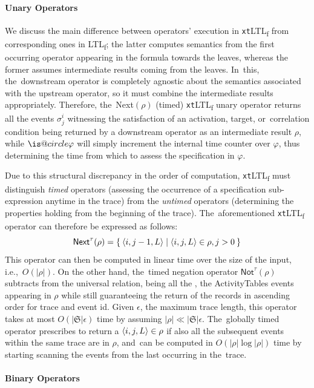 \documentclass[information,article,accept,pdftex,oneauthor]{Definitions/mdpi}
\makeatletter
\DeclareRobustCommand{\iscircle}{\mathord{\mathpalette\is@circle\relax}}
\newcommand\is@circle[2]{%
  \begingroup
  \sbox\z@{\raisebox{\depth}{$\m@th#1\bigcirc$}}%
  \sbox\tw@{$#1\square$}%
  \resizebox{!}{\ht\tw@}{\usebox{\z@}}%
  \endgroup
}
\newcommand{\Next}{\ensuremath{\iscircle}}
\newcommand{\LOG}{\ensuremath{\mathfrak{S}}}
\makeatother
\begin{document}
\paragraph{Unary Operators} 

We discuss the main difference between  operators' execution in  \texttt{xt}LTL\textsubscript{f} from corresponding ones in LTL\textsubscript{f}; the latter computes semantics from the first occurring operator appearing in the formula towards the leaves, whereas the former assumes intermediate results coming from the leaves. In~this, the~downstream operator is completely agnostic about the semantics associated with the upstream operator, so it must combine the intermediate results appropriately. Therefore, the~\textsf{Next}$(\rho)$ (timed) \texttt{xt}LTL\textsubscript{f} unary operator returns all the events $\sigma^i_j$ witnessing the satisfaction of an activation, target, or~correlation condition being returned by a downstream operator as an intermediate result $\rho$, while $\Next\varphi$ will simply increment the internal time counter over $\varphi$, thus determining the time from which to assess the specification in $\varphi$.

Due to this structural discrepancy in the order of computation, \texttt{xt}LTL\textsubscript{f} must distinguish \textit{timed} operators (assessing the occurrence of a specification sub-expression anytime in the trace) from the \textit{untimed} operators (determining the properties holding from the beginning of the trace). The~aforementioned \texttt{xt}LTL\textsubscript{f} operator can therefore be expressed as follows:
\[\textsf{Next}^\tau(\rho)=\Set{\braket{i,j-1,L}|\braket{i,j,L}\in\rho,j>0}\]
This operator can then be computed in linear time over the size of the input, i.e.,~$O(|\rho|)$.
On the other hand, the~timed negation operator $\textsf{Not}^\tau(\rho)$ subtracts from the universal relation, being all the , the \textsf{ActivityTables} events appearing in $\rho$ while still guaranteeing the return of the records in ascending order for trace and event id. Given $\epsilon$, the maximum trace length, this operator takes at most $O(|\LOG|\epsilon)$ time by assuming $|\rho|\ll |\LOG|\epsilon$. The~globally timed operator prescribes to return a $\braket{i,j,L}\in\rho$ if also all the subsequent events within the same trace are in $\rho$, and~can be computed in $O(|\rho| \log|\rho|)$ time by starting scanning the events from the last occurring in the~trace.  

\paragraph{Binary Operators} 
\end{document}

